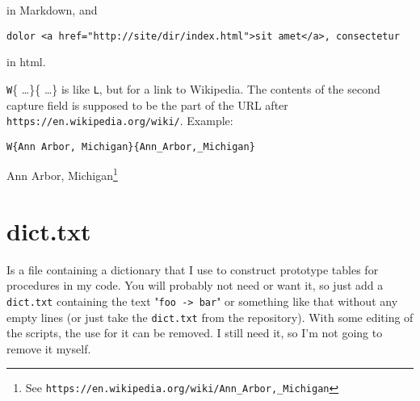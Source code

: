 in Markdown, and

\begin{verbatim}
dolor <a href="http://site/dir/index.html">sit amet</a>, consectetur
\end{verbatim}

in html.

\texttt{W}\{ \ldots  \}\{ \ldots  \} is like \texttt{L}, but for a link to Wikipedia. The contents of the second capture field is supposed to be the part of the URL after \texttt{https://en.wikipedia.org/wiki/}. Example:

\begin{verbatim}
W{Ann Arbor, Michigan}{Ann_Arbor,_Michigan}
\end{verbatim}

Ann Arbor, Michigan\footnote{See \texttt{https://en.wikipedia.org/wiki/Ann\_Arbor,\_Michigan}}

\chapter{dict.txt}
\label{dicttxt}

Is a file containing a dictionary that I use to construct prototype tables for procedures in my code. You will probably not need or want it, so just add a \texttt{dict.txt} containing the text "\texttt{foo -> bar}" or something like that without any empty lines (or just take the \texttt{dict.txt} from the repository). With some editing of the scripts, the use for it can be removed. I still need it, so I'm not going to remove it myself.


